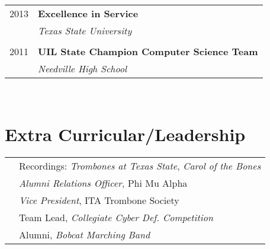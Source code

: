 \documentclass[10pt]{article} %
\begin{document}
\begin{minipage}[t]{0.44\textwidth}
\begin{tabular}{rl}
2013     & \textbf{Excellence in Service}\\
& \textit{Texas State University}\\ \\


2011	 & \textbf{UIL State Champion Computer Science Team}\\
& \textit{Needville High School}
\end{tabular}\\[10pt]



\section{Extra Curricular/Leadership} 

\begin{tabular}{rl}
& Recordings: \textit{Trombones at Texas State}, \textit{Carol of the Bones} \\
& \textit{Alumni Relations Officer}, Phi Mu Alpha \\
& \textit{Vice President}, ITA Trombone Society\\
& Team Lead, \textit{Collegiate Cyber Def. Competition}\\
& Alumni, \textit{Bobcat Marching Band}\\
\end{tabular}\\[10pt]

	
\end{minipage} %
\end{document}
